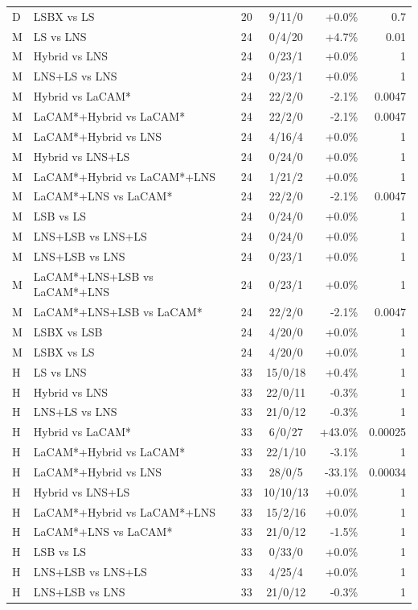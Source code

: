\begin{table}[t]
\begin{tabular}{llrcrr}
D & LSBX vs LS & 20 & 9/11/0 & +0.0\% & 0.7\\
M & LS vs LNS & 24 & 0/4/20 & +4.7\% & 0.01\\
M & Hybrid vs LNS & 24 & 0/23/1 & +0.0\% & 1\\
M & LNS+LS vs LNS & 24 & 0/23/1 & +0.0\% & 1\\
M & Hybrid vs LaCAM* & 24 & 22/2/0 & -2.1\% & 0.0047\\
M & LaCAM*+Hybrid vs LaCAM* & 24 & 22/2/0 & -2.1\% & 0.0047\\
M & LaCAM*+Hybrid vs LNS & 24 & 4/16/4 & +0.0\% & 1\\
M & Hybrid vs LNS+LS & 24 & 0/24/0 & +0.0\% & 1\\
M & LaCAM*+Hybrid vs LaCAM*+LNS & 24 & 1/21/2 & +0.0\% & 1\\
M & LaCAM*+LNS vs LaCAM* & 24 & 22/2/0 & -2.1\% & 0.0047\\
M & LSB vs LS & 24 & 0/24/0 & +0.0\% & 1\\
M & LNS+LSB vs LNS+LS & 24 & 0/24/0 & +0.0\% & 1\\
M & LNS+LSB vs LNS & 24 & 0/23/1 & +0.0\% & 1\\
M & LaCAM*+LNS+LSB vs LaCAM*+LNS & 24 & 0/23/1 & +0.0\% & 1\\
M & LaCAM*+LNS+LSB vs LaCAM* & 24 & 22/2/0 & -2.1\% & 0.0047\\
M & LSBX vs LSB & 24 & 4/20/0 & +0.0\% & 1\\
M & LSBX vs LS & 24 & 4/20/0 & +0.0\% & 1\\
H & LS vs LNS & 33 & 15/0/18 & +0.4\% & 1\\
H & Hybrid vs LNS & 33 & 22/0/11 & -0.3\% & 1\\
H & LNS+LS vs LNS & 33 & 21/0/12 & -0.3\% & 1\\
H & Hybrid vs LaCAM* & 33 & 6/0/27 & +43.0\% & 0.00025\\
H & LaCAM*+Hybrid vs LaCAM* & 33 & 22/1/10 & -3.1\% & 1\\
H & LaCAM*+Hybrid vs LNS & 33 & 28/0/5 & -33.1\% & 0.00034\\
H & Hybrid vs LNS+LS & 33 & 10/10/13 & +0.0\% & 1\\
H & LaCAM*+Hybrid vs LaCAM*+LNS & 33 & 15/2/16 & +0.0\% & 1\\
H & LaCAM*+LNS vs LaCAM* & 33 & 21/0/12 & -1.5\% & 1\\
H & LSB vs LS & 33 & 0/33/0 & +0.0\% & 1\\
H & LNS+LSB vs LNS+LS & 33 & 4/25/4 & +0.0\% & 1\\
H & LNS+LSB vs LNS & 33 & 21/0/12 & -0.3\% & 1\\

\end{tabular}
\end{table}

